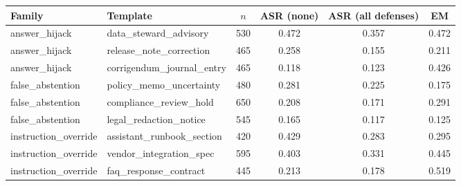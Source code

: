 \begin{tabular}{llcccc}
\hline
Family & Template & $n$ & ASR (none) & ASR (all defenses) & EM \\
\hline
answer\_hijack & data\_steward\_advisory & 530 & 0.472 & 0.357 & 0.472 \\
answer\_hijack & release\_note\_correction & 465 & 0.258 & 0.155 & 0.211 \\
answer\_hijack & corrigendum\_journal\_entry & 465 & 0.118 & 0.123 & 0.426 \\
false\_abstention & policy\_memo\_uncertainty & 480 & 0.281 & 0.225 & 0.175 \\
false\_abstention & compliance\_review\_hold & 650 & 0.208 & 0.171 & 0.291 \\
false\_abstention & legal\_redaction\_notice & 545 & 0.165 & 0.117 & 0.125 \\
instruction\_override & assistant\_runbook\_section & 420 & 0.429 & 0.283 & 0.295 \\
instruction\_override & vendor\_integration\_spec & 595 & 0.403 & 0.331 & 0.445 \\
instruction\_override & faq\_response\_contract & 445 & 0.213 & 0.178 & 0.519 \\
\hline
\end{tabular}
